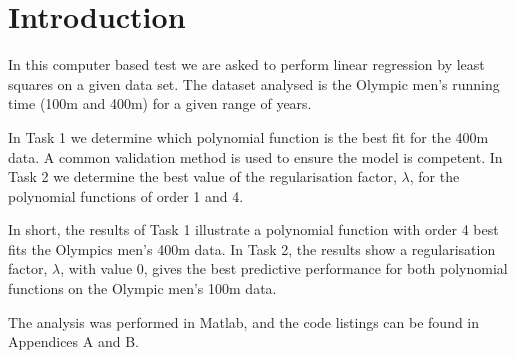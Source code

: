 \section{Introduction}
In this computer based test we are asked to perform linear regression by least squares on a given data set. The dataset analysed is the Olympic men's running time (100m and 400m) for a given range of years. 

In Task 1 we determine which polynomial function is the best fit for the 400m data. A common validation method is used to ensure the model is competent. In Task 2 we determine the best value of the regularisation factor, $\lambda$, for the polynomial functions of order 1 and 4.

In short, the results of Task 1 illustrate a polynomial function with order 4 best fits the Olympics men's 400m data. In Task 2, the results show a regularisation factor, $\lambda$, with value 0, gives the best predictive performance for both polynomial functions on the Olympic men's 100m data.

The analysis was performed in Matlab, and the code listings can be found in Appendices A and B.

